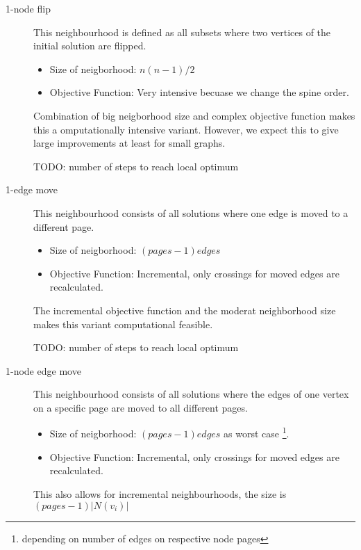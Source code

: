 \documentclass{scrartcl}
\begin{document}
\begin{description}
\item[1-node flip] 
    
    This neighbourhood is defined as all subsets where two vertices of the initial solution are flipped. 
    \begin{itemize}
        \item Size of neigborhood: $n(n-1)/2$
        \item Objective Function: Very intensive becuase we change the spine order.

    \end{itemize}

    Combination of big neigborhood size and complex objective function makes this  a omputationally intensive variant.
    However, we expect this to give large improvements at least for small graphs.

    TODO: number of steps to reach local optimum
	
\item[1-edge move] This neighbourhood consists of all solutions where one edge is moved to a different page. 
     \begin{itemize}
        \item Size of neigborhood: $(pages-1) edges$ 
        \item Objective Function: Incremental, only crossings for moved edges are recalculated.
    \end{itemize}
   
    The incremental objective function and the moderat neighborhood size makes this variant computational feasible.

    TODO: number of steps to reach local optimum
	
\item[1-node edge move] This neighbourhood consists of all solutions where the edges of
	one vertex on a specific page are moved to all different pages. 

    \begin{itemize}
        \item Size of neigborhood: $(pages-1) edges$ as worst case \footnote{depending on number of edges on respective node pages}.
        \item Objective Function: Incremental, only crossings for moved edges are recalculated.
    \end{itemize}
    
    This also allows for incremental neighbourhoods, the
		size is $(pages-1) |N(v_i)|$

\end{description}
\end{document}

